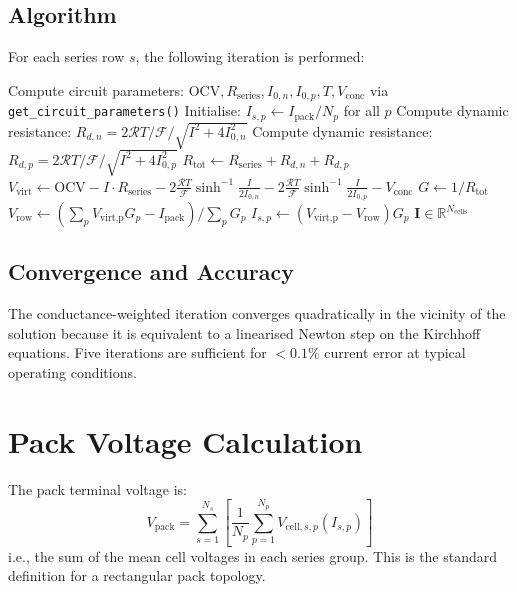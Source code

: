 \subsection{Algorithm}

For each series row $s$, the following iteration is performed:

\begin{algorithm}[H]
\caption{Kirchhoff Current Distribution with Butler--Volmer Dynamic Resistance}
\label{alg:current_dist}
\begin{algorithmic}[1]
\State Compute circuit parameters: $\text{OCV}, R_\text{series}, I_{0,n}, I_{0,p}, T, V_\text{conc}$ via \texttt{get\_circuit\_parameters()}
\State Initialise: $I_{s,p} \leftarrow I_\text{pack}/N_p$ for all $p$
  \State Compute dynamic resistance: $R_{d,n} = 2\mathcal{R}T/\mathcal{F} / \sqrt{I^2 + 4I_{0,n}^2}$
  \State Compute dynamic resistance: $R_{d,p} = 2\mathcal{R}T/\mathcal{F} / \sqrt{I^2 + 4I_{0,p}^2}$
  \State $R_\text{tot} \leftarrow R_\text{series} + R_{d,n} + R_{d,p}$
  \State $V_\text{virt} \leftarrow \text{OCV} - I \cdot R_\text{series} - 2\frac{\mathcal{R}T}{\mathcal{F}}\sinh^{-1}\!\frac{I}{2I_{0,n}} - 2\frac{\mathcal{R}T}{\mathcal{F}}\sinh^{-1}\!\frac{I}{2I_{0,p}} - V_\text{conc}$
  \State $G \leftarrow 1/R_\text{tot}$
  \State $V_\text{row} \leftarrow \left(\sum_p V_\text{virt,p} G_p - I_\text{pack}\right) / \sum_p G_p$
  \State $I_{s,p} \leftarrow (V_\text{virt,p} - V_\text{row}) G_p$
\EndFor
\State \Return $\mathbf{I} \in \mathbb{R}^{N_\text{cells}}$
\end{algorithmic}
\end{algorithm}

\subsection{Convergence and Accuracy}

The conductance-weighted iteration converges quadratically in the vicinity of the solution because it is equivalent to a linearised Newton step on the Kirchhoff equations. Five iterations are sufficient for $<0.1\%$ current error at typical operating conditions.

\section{Pack Voltage Calculation}
\label{sec:pack_voltage}

The pack terminal voltage is:
\begin{equation}
  V_\text{pack} = \sum_{s=1}^{N_s} \left[\frac{1}{N_p}\sum_{p=1}^{N_p} V_{\text{cell},s,p}(I_{s,p})\right]
  \label{eq:pack_voltage}
\end{equation}
i.e., the sum of the mean cell voltages in each series group. This is the standard definition for a rectangular pack topology.

